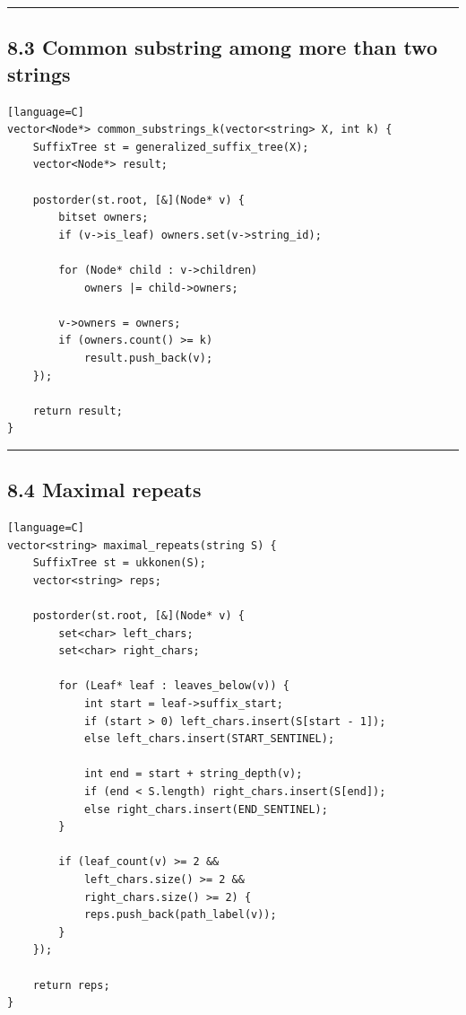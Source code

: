 \documentclass[11pt]{article}
\begin{document}
\begin{center}\rule{0.5\linewidth}{0.5pt}\end{center}

\subsection{8.3 Common substring among more than two strings}\label{common-substring-among-more-than-two-strings}

\begin{verbatim}[language=C]
vector<Node*> common_substrings_k(vector<string> X, int k) {
    SuffixTree st = generalized_suffix_tree(X);
    vector<Node*> result;

    postorder(st.root, [&](Node* v) {
        bitset owners;
        if (v->is_leaf) owners.set(v->string_id);

        for (Node* child : v->children)
            owners |= child->owners;

        v->owners = owners;
        if (owners.count() >= k)
            result.push_back(v);
    });

    return result;
}
\end{verbatim}

\begin{center}\rule{0.5\linewidth}{0.5pt}\end{center}

\subsection{8.4 Maximal repeats}\label{maximal-repeats}

\begin{verbatim}[language=C]
vector<string> maximal_repeats(string S) {
    SuffixTree st = ukkonen(S);
    vector<string> reps;

    postorder(st.root, [&](Node* v) {
        set<char> left_chars;
        set<char> right_chars;

        for (Leaf* leaf : leaves_below(v)) {
            int start = leaf->suffix_start;
            if (start > 0) left_chars.insert(S[start - 1]);
            else left_chars.insert(START_SENTINEL);

            int end = start + string_depth(v);
            if (end < S.length) right_chars.insert(S[end]);
            else right_chars.insert(END_SENTINEL);
        }

        if (leaf_count(v) >= 2 &&
            left_chars.size() >= 2 &&
            right_chars.size() >= 2) {
            reps.push_back(path_label(v));
        }
    });

    return reps;
}
\end{verbatim}
\end{document}
